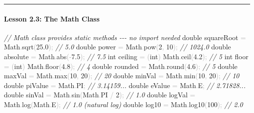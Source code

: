 \documentclass[
  justified,
  openright,
]{tufte-book}
\let\subsection\paragraph
\let\paragraph\paragraph
\newcommand{\CommentTok}[1]{\textcolor{CodeComment}{\textit{#1}}}  %
\newcommand{\CodeNumTok}[1]{\textcolor{CodeNumber}{#1}}             %
\newcommand{\CodeFuncTok}[1]{\textcolor{CodeKeyword}{#1}}           %
\newcommand{\CodeTypeTok}[1]{\textcolor{CodeType}{#1}}              %
\newcommand{\OperatorTok}[1]{\textcolor{DarkGray}{#1}}              %
\newenvironment{Shaded}{%
  \begin{mdframed}[style=TufteCode]%
}{%
  \end{mdframed}%
}
\let\subsection\paragraph
\let\paragraph\paragraph
\begin{document}
\begin{center}\rule{0.5\linewidth}{0.5pt}\end{center}

\subsection{Lesson 2.3: The Math Class}\label{lesson-2.3-the-math-class}

\begin{Shaded}
\begin{Highlighting}[]
\CommentTok{// Math class provides static methods {-}{-}{-} no import needed}
\CodeTypeTok{double} squareRoot \OperatorTok{=} Math\OperatorTok{.}\CodeFuncTok{sqrt}\OperatorTok{(}\CodeNumTok{25.0}\OperatorTok{);}     \CommentTok{// 5.0}
\CodeTypeTok{double} power \OperatorTok{=} Math\OperatorTok{.}\CodeFuncTok{pow}\OperatorTok{(}\CodeNumTok{2}\OperatorTok{,} \CodeNumTok{10}\OperatorTok{);}           \CommentTok{// 1024.0}
\CodeTypeTok{double} absolute \OperatorTok{=} Math\OperatorTok{.}\CodeFuncTok{abs}\OperatorTok{({-}}\CodeNumTok{7.5}\OperatorTok{);}         \CommentTok{// 7.5}
\CodeTypeTok{int} ceiling \OperatorTok{=} \OperatorTok{(}\CodeTypeTok{int}\OperatorTok{)} Math\OperatorTok{.}\CodeFuncTok{ceil}\OperatorTok{(}\CodeNumTok{4.2}\OperatorTok{);}       \CommentTok{// 5}
\CodeTypeTok{int} floor \OperatorTok{=} \OperatorTok{(}\CodeTypeTok{int}\OperatorTok{)} Math\OperatorTok{.}\CodeFuncTok{floor}\OperatorTok{(}\CodeNumTok{4.8}\OperatorTok{);}        \CommentTok{// 4}
\CodeTypeTok{double} rounded \OperatorTok{=} Math\OperatorTok{.}\CodeFuncTok{round}\OperatorTok{(}\CodeNumTok{4.6}\OperatorTok{);}         \CommentTok{// 5}
\CodeTypeTok{double} maxVal \OperatorTok{=} Math\OperatorTok{.}\CodeFuncTok{max}\OperatorTok{(}\CodeNumTok{10}\OperatorTok{,} \CodeNumTok{20}\OperatorTok{);}         \CommentTok{// 20}
\CodeTypeTok{double} minVal \OperatorTok{=} Math\OperatorTok{.}\CodeFuncTok{min}\OperatorTok{(}\CodeNumTok{10}\OperatorTok{,} \CodeNumTok{20}\OperatorTok{);}         \CommentTok{// 10}
\CodeTypeTok{double} piValue \OperatorTok{=} Math\OperatorTok{.}\CodeFuncTok{PI}\OperatorTok{;}                 \CommentTok{// 3.14159...}
\CodeTypeTok{double} eValue \OperatorTok{=} Math\OperatorTok{.}\CodeFuncTok{E}\OperatorTok{;}                   \CommentTok{// 2.71828...}
\CodeTypeTok{double} sinVal \OperatorTok{=} Math\OperatorTok{.}\CodeFuncTok{sin}\OperatorTok{(}Math\OperatorTok{.}\CodeFuncTok{PI} \OperatorTok{/} \CodeNumTok{2}\OperatorTok{);}   \CommentTok{// 1.0}
\CodeTypeTok{double} logVal \OperatorTok{=} Math\OperatorTok{.}\CodeFuncTok{log}\OperatorTok{(}Math\OperatorTok{.}\CodeFuncTok{E}\OperatorTok{);}        \CommentTok{// 1.0  (natural log)}
\CodeTypeTok{double} log10 \OperatorTok{=} Math\OperatorTok{.}\CodeFuncTok{log10}\OperatorTok{(}\CodeNumTok{100}\OperatorTok{);}          \CommentTok{// 2.0}
\end{Highlighting}
\end{Shaded}
\end{document}
